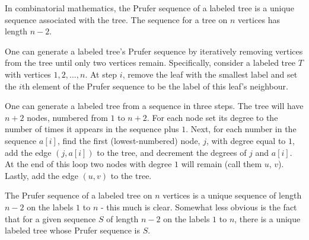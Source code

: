 
In combinatorial mathematics, the Prufer sequence of a labeled tree is a unique sequence associated with the tree. The sequence for a tree on $n$ vertices has length $n-2$.

One can generate a labeled tree's Prufer sequence by iteratively removing vertices from the tree until only two vertices remain. Specifically, consider a labeled tree $T$ with vertices ${1, 2, ..., n}$. At step $i$, remove the leaf with the smallest label and set the $i$th element of the Prufer sequence to be the label of this leaf's neighbour.

One can generate a labeled tree from a sequence in three steps. The tree will have $n+2$ nodes, numbered from $1$ to $n+2$. For each node set its degree to the number of times it appears in the sequence plus $1$. Next, for each number in the sequence $a[i]$, find the first (lowest-numbered) node, $j$, with degree equal to $1$, add the edge $(j, a[i])$ to the tree, and decrement the degrees of $j$ and $a[i]$. At the end of this loop two nodes with degree $1$ will remain (call them $u$, $v$). Lastly, add the edge $(u,v)$ to the tree.

The Prufer sequence of a labeled tree on $n$ vertices is a unique sequence of length $n-2$ on the labels $1$ to $n$ - this much is clear. Somewhat less obvious is the fact that for a given sequence $S$ of length $n-2$ on the labels $1$ to $n$, there is a unique labeled tree whose Prufer sequence is $S$.

